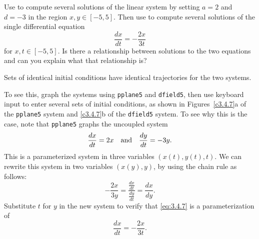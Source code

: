 \documentclass{ximera}
\begin{document}
\begin{computerExercise} \label{c3.4.7}
Use {\pplane} to compute several solutions of the linear system by
setting $a=2$ and $d=-3$ in the region $x,y\in[-5,5]$.  Then use
{\dfield} to compute several solutions of the single differential
equation
\[
\frac{dx}{dt} = -\frac{2x}{3t}
\]
for $x,t\in[-5,5]$.  Is there a relationship between solutions to the
two equations and can you explain what that relationship is?

\begin{solution}

\ans Sets of identical initial conditions have identical trajectories
for the two systems. 

\soln To see this, graph the systems using {\tt pplane5} and
{\tt dfield5}, then use keyboard input to enter several sets of initial
conditions, as shown in Figures~\ref{c3.4.7}a of the {\tt pplane5} system
and \ref{c3.4.7}b of the {\tt dfield5} system.  To see why this is the case,
note that {\tt pplane5} graphs the uncoupled system
\begin{equation} \label{eq:3.4.7}
\frac{dx}{dt} = 2x \quad\mbox{and}\quad \frac{dy}{dt} = -3y.
\end{equation}
This is a parameterized system in three variables $(x(t),y(t),t)$.
We can rewrite this system in two variables $(x(y),y)$, by using the
chain rule as follows:
\[ 
-\frac{2x}{3y} = \frac{\frac{dx}{dt}}{\frac{dy}{dt}} = \frac{dx}{dy}. 
\]
Substitute $t$ for $y$ in the new system to verify that \eqref{eq:3.4.7}
is a parameterization of
\[ 
\frac{dx}{dt} = -\frac{2x}{3t}. 
\]
\begin{figure}[htb]
			\centerline{%
			}
\end{figure}
\end{solution}
\end{computerExercise}
\end{document}
